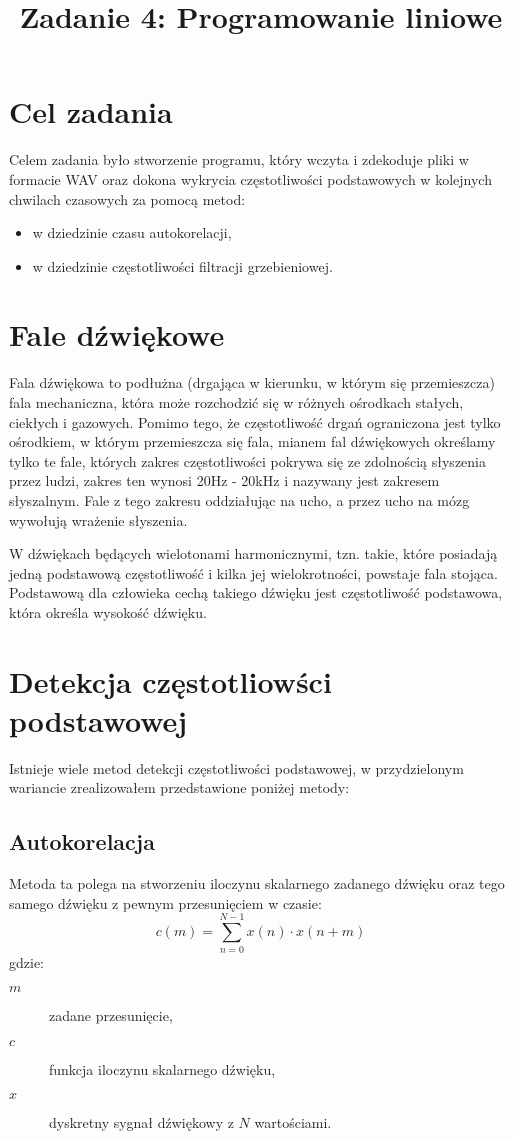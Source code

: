 \documentclass{classrep}
\author{%
  \studentinfo{Michał Janiszewski}{169485}
}
\title{Zadanie 4: Programowanie liniowe}
\begin{document}
\maketitle

\section{Cel zadania}
Celem zadania było stworzenie programu, który wczyta i zdekoduje pliki w formacie WAV oraz dokona wykrycia częstotliwości podstawowych w kolejnych chwilach czasowych za pomocą metod:
\begin{itemize}
 \item w dziedzinie czasu \ppauza autokorelacji,
 \item w dziedzinie częstotliwości \ppauza filtracji grzebieniowej.
\end{itemize}

\section{Fale dźwiękowe}
Fala dźwiękowa to podłużna (drgająca w kierunku, w którym się przemieszcza) fala mechaniczna, która może rozchodzić się w różnych ośrodkach \ppauza stałych, ciekłych i gazowych. Pomimo tego, że częstotliwość drgań ograniczona jest tylko ośrodkiem, w którym przemieszcza się fala, mianem fal dźwiękowych określamy tylko te fale, których zakres częstotliwości pokrywa się ze zdolnością słyszenia przez ludzi, zakres ten wynosi 20Hz - 20kHz i nazywany jest zakresem słyszalnym. Fale z tego zakresu oddziałując na ucho, a przez ucho na mózg wywołują wrażenie słyszenia.

W dźwiękach będących wielotonami harmonicznymi, tzn. takie, które posiadają jedną podstawową częstotliwość i kilka jej wielokrotności, powstaje fala stojąca. Podstawową dla człowieka cechą takiego dźwięku jest częstotliwość podstawowa, która określa wysokość dźwięku.

\section{Detekcja częstotliowści podstawowej}
Istnieje wiele metod detekcji częstotliwości podstawowej, w przydzielonym wariancie zrealizowałem przedstawione poniżej metody:
\subsection{Autokorelacja}
Metoda ta polega na stworzeniu iloczynu skalarnego zadanego dźwięku oraz tego samego dźwięku z pewnym przesunięciem w czasie:
\begin{equation}
 c(m) = \displaystyle \sum^{N - 1}_{n = 0} x(n) \cdot x(n + m)
\end{equation}
gdzie:
\begin{description}
 \item[$m$] zadane przesunięcie,
 \item[$c$] funkcja iloczynu skalarnego dźwięku,
 \item[$x$] dyskretny sygnał dźwiękowy z $N$ wartościami.
\end{description}
\end{document}
